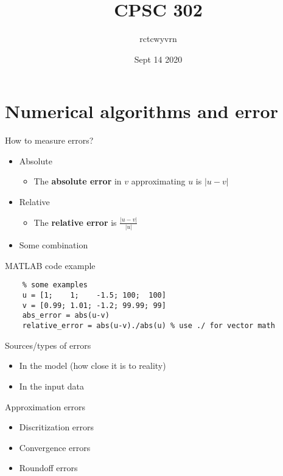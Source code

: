 \documentclass{article}
\title{CPSC 302}
\author{rctcwyvrn}
\date{Sept 14 2020}
\begin{document}
\maketitle

\section{Numerical algorithms and error}
How to measure errors?
\begin{itemize}
	\item Absolute
	\begin{itemize}
		\item The {\color{blue} \textbf{absolute error}} in $v$ approximating $u$ is $|u-v|$
	\end{itemize}
	\item Relative
	\begin{itemize}
		\item The {\color{blue} \textbf{relative error}} is $\frac{|u-v|}{|u|}$
	\end{itemize}
	\item Some combination
\end{itemize}
MATLAB code example
\begin{lstlisting}
	% some examples
	u = [1;	   1;    -1.5; 100;  100]
	v = [0.99; 1.01; -1.2; 99.99; 99]
	abs_error = abs(u-v)
	relative_error = abs(u-v)./abs(u) % use ./ for vector math
\end{lstlisting}
Sources/types of errors
\begin{itemize}
	\item In the model (how close it is to reality)
	\item In the input data
\end{itemize}
Approximation errors
\begin{itemize}
	\item Discritization errors
	\item Convergence errors
	\item Roundoff errors
\end{itemize}
\end{document}
